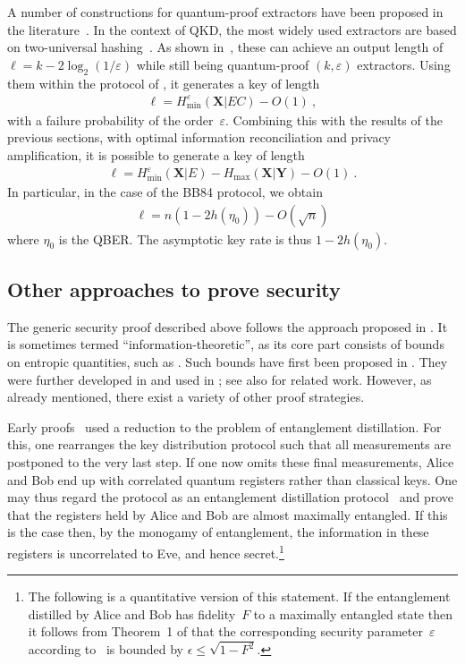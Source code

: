 A number of constructions for quantum-proof extractors have been proposed in the literature~\cite{RK05,Ren05,FS08,KT08,DPVR12,BT12,MPS12,BFS17}. In the context of QKD, the most widely used extractors are based on two-universal hashing~\cite{CW79,WC81}. As shown in~\textcite{RK05,Ren05,TSSR10}, these  can achieve an output length of  $\ell = k -  2 \log_2(1/\varepsilon)$ while still being quantum-proof $(k, \varepsilon)$ extractors. Using them within the protocol of , it generates a key of length 
\begin{align}
   \ell = H_{\min}^\varepsilon(\mathbf{X} | E C) - O(1) \ ,
 \end{align}
 with a failure probability of the order~$\varepsilon$.
Combining this with the results of the previous sections, with optimal information reconciliation and privacy amplification, it is possible to generate a key of length
\begin{align}
  \ell = H_{\min}^\varepsilon(\mathbf{X} | E) - H_{\max}(\mathbf{X} | \mathbf{Y}) - O(1) \ .
\end{align}
In particular, in the case of the BB84 protocol, we obtain
\begin{align}
  \ell = n (1-2 h(\eta_0)) - O(\sqrt{n})
\end{align}
where $\eta_0$ is the QBER. The asymptotic key rate is thus $1-2 h(\eta_0)$. 

\subsection{Other approaches to prove security} \label{sec_othersecurityproofs}

The generic security proof described above follows the approach proposed in \textcite{Ren05}. It is sometimes termed ``information-theoretic'', as its core part consists of bounds on entropic quantities, such as . Such bounds have first been proposed in \textcite{DW05}. They were further developed in \textcite{RenRen12} and used in \textcite{PhysRevLett.95.080501,RGK05}; see also \textcite{christandl2007unifying} for related work. However, as already mentioned, there exist a variety of other proof strategies. 

Early proofs~\cite{LoChau99,SP00} used a reduction to the problem of entanglement distillation. For this, one rearranges the key distribution protocol such that all measurements are postponed to the very last step. If one now omits these final measurements, Alice and Bob end up with correlated quantum registers rather than classical keys. One may thus regard the protocol as an entanglement distillation protocol~\cite{Bennett96,Benett96b} and prove that the registers held by Alice and Bob are almost maximally entangled. If this is the case then, by the monogamy of entanglement, the information in these registers is uncorrelated to Eve, and hence secret.\footnote{The following is a quantitative version of this statement. If the entanglement distilled by Alice and Bob has fidelity~$F$ to a maximally entangled state then it follows from Theorem~1 of \textcite{FuchsvanGraaf} that the corresponding security parameter~$\varepsilon$ according to~ is bounded by $\epsilon \leq \sqrt{1-F^2}$.}

